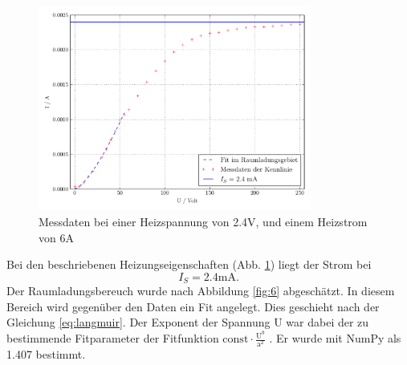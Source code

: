 \begin{figure}[H]
  \centering
  \includegraphics[width=0.8\textwidth]{build/Kennlinie4.pdf}
  \caption{Messdaten bei einer Heizspannung von 2.4V, und einem Heizstrom von 6A \cite{sample}}
  \label{fig:kenn4}
\end{figure}
Bei den beschriebenen Heizungseigenschaften (Abb. \ref{fig:kenn4}) liegt der Strom bei 
\begin{equation}
I_S = 2.4 \mathrm{mA}.
\label{eq:kenn4ergebnis}
\end{equation}
Der Raumladungsbereuch wurde nach Abbildung \ref{fig:6} abgeschätzt. In diesem Bereich wird
gegenüber den Daten ein Fit angelegt. Dies geschieht nach der Gleichung \eqref{eq:langmuir}. Der Exponent der Spannung U war dabei
der zu bestimmende Fitparameter der Fitfunktion $\mathrm{const} \cdot \frac{\mathrm{U}^b}{\mathrm{a}^2}$ . Er wurde mit NumPy \cite{numpy} als 1.407 bestimmt.



